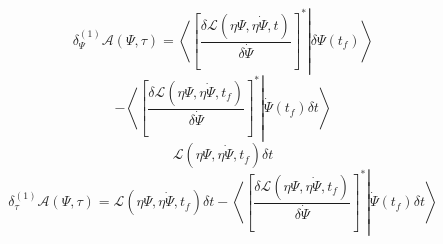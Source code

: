 \documentclass[aps,preprint]{revtex4}
\begin{document}
\begin{equation}
\delta _{\Psi }^{\left( 1\right) }\mathcal{A}\left( \Psi ,\tau \right)
=\left\langle \left. \left[ \frac{\delta \mathcal{L}\left( \eta \Psi ,%
\overset{\cdot }{\eta \Psi },t\right) }{\delta \dot{\Psi}}\right] ^{\ast
}\right\vert \delta \Psi \left( t_{f}\right) \right\rangle
\end{equation}%
\begin{equation}
-\left\langle \left. \left[ \frac{\delta \mathcal{L}\left( \eta \Psi ,%
\overset{\cdot }{\eta \Psi },t_{f}\right) }{\delta \dot{\Psi}}\right] ^{\ast
}\right\vert \dot{\Psi}\left( t_{f}\right) \delta t\right\rangle
\end{equation}%
\begin{equation}
\mathcal{L}\left( \eta \Psi ,\overset{\cdot }{\eta \Psi },t_{f}\right)
\delta t
\end{equation}%
\begin{equation}
\delta _{\tau }^{\left( 1\right) }\mathcal{A}\left( \Psi ,\tau \right) =%
\mathcal{L}\left( \eta \Psi ,\overset{\cdot }{\eta \Psi },t_{f}\right)
\delta t-\left\langle \left. \left[ \frac{\delta \mathcal{L}\left( \eta \Psi
,\overset{\cdot }{\eta \Psi },t_{f}\right) }{\delta \dot{\Psi}}\right]
^{\ast }\right\vert \dot{\Psi}\left( t_{f}\right) \delta t\right\rangle
\end{equation}%
\end{document}
